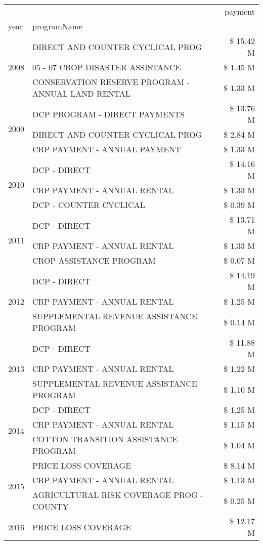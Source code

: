 \begin{tabular}{llr}
\toprule
 &  & payment \\
year & programName &  \\
\midrule
\multirow[t]{3}{*}{2008} & DIRECT AND COUNTER CYCLICAL PROG & \$ 15.42 M \\
 & 05 - 07 CROP DISASTER ASSISTANCE & \$ 1.45 M \\
 & CONSERVATION RESERVE PROGRAM - ANNUAL LAND RENTAL & \$ 1.33 M \\
\cline{1-3}
\multirow[t]{3}{*}{2009} & DCP PROGRAM - DIRECT PAYMENTS & \$ 13.76 M \\
 & DIRECT AND COUNTER CYCLICAL PROG & \$ 2.84 M \\
 & CRP PAYMENT - ANNUAL PAYMENT & \$ 1.33 M \\
\cline{1-3}
\multirow[t]{3}{*}{2010} & DCP - DIRECT & \$ 14.16 M \\
 & CRP PAYMENT - ANNUAL RENTAL & \$ 1.33 M \\
 & DCP - COUNTER CYCLICAL & \$ 0.39 M \\
\cline{1-3}
\multirow[t]{3}{*}{2011} & DCP - DIRECT & \$ 13.71 M \\
 & CRP PAYMENT - ANNUAL RENTAL & \$ 1.33 M \\
 & CROP ASSISTANCE PROGRAM & \$ 0.07 M \\
\cline{1-3}
\multirow[t]{3}{*}{2012} & DCP - DIRECT & \$ 14.19 M \\
 & CRP PAYMENT - ANNUAL RENTAL & \$ 1.25 M \\
 & SUPPLEMENTAL REVENUE ASSISTANCE PROGRAM & \$ 0.14 M \\
\cline{1-3}
\multirow[t]{3}{*}{2013} & DCP - DIRECT & \$ 11.88 M \\
 & CRP PAYMENT - ANNUAL RENTAL & \$ 1.22 M \\
 & SUPPLEMENTAL REVENUE ASSISTANCE PROGRAM & \$ 1.10 M \\
\cline{1-3}
\multirow[t]{3}{*}{2014} & DCP - DIRECT & \$ 1.25 M \\
 & CRP PAYMENT - ANNUAL RENTAL & \$ 1.15 M \\
 & COTTON TRANSITION ASSISTANCE PROGRAM & \$ 1.04 M \\
\cline{1-3}
\multirow[t]{3}{*}{2015} & PRICE LOSS COVERAGE & \$ 8.14 M \\
 & CRP PAYMENT - ANNUAL RENTAL & \$ 1.13 M \\
 & AGRICULTURAL RISK COVERAGE PROG - COUNTY & \$ 0.25 M \\
\cline{1-3}
\multirow[t]{3}{*}{2016} & PRICE LOSS COVERAGE & \$ 12.17 M \\

\end{tabular}
